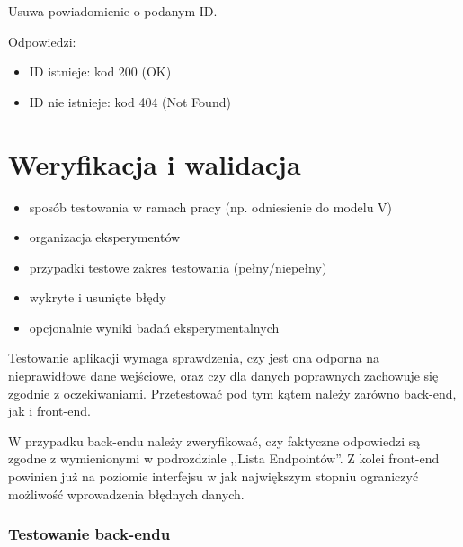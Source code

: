 \documentclass[a4paper,twoside,12pt]{book}
\begin{document}
Usuwa powiadomienie o podanym ID.

Odpowiedzi: 
\begin{itemize}
	\item ID istnieje: kod 200 (OK) 
	\item ID nie istnieje: kod 404 (Not Found)
\end{itemize}

%      




\chapter{Weryfikacja i walidacja}
\label{ch:06}
\begin{itemize}
\item sposób testowania w ramach pracy (np. odniesienie do modelu V)
\item organizacja eksperymentów
\item przypadki testowe zakres testowania (pełny/niepełny)
\item wykryte i usunięte błędy
\item opcjonalnie wyniki badań eksperymentalnych
\end{itemize}

Testowanie aplikacji wymaga sprawdzenia, czy jest ona odporna na nieprawidłowe dane wejściowe, oraz czy dla danych poprawnych zachowuje się zgodnie z oczekiwaniami. Przetestować pod tym kątem należy zarówno back-end, jak i front-end.

W przypadku back-endu należy zweryfikować, czy faktyczne odpowiedzi są zgodne z wymienionymi w podrozdziale ,,Lista Endpointów''. Z kolei front-end powinien już na poziomie interfejsu w jak największym stopniu ograniczyć możliwość wprowadzenia błędnych danych.

\subsection{Testowanie back-endu}
\end{document}

